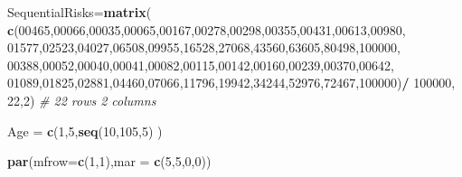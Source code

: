 \documentclass[]{book}
\newenvironment{Shaded}{\begin{snugshade}}{\end{snugshade}}
\newcommand{\CommentTok}[1]{\textcolor[rgb]{0.56,0.35,0.01}{\textit{#1}}}
\newcommand{\DataTypeTok}[1]{\textcolor[rgb]{0.13,0.29,0.53}{#1}}
\newcommand{\DecValTok}[1]{\textcolor[rgb]{0.00,0.00,0.81}{#1}}
\newcommand{\KeywordTok}[1]{\textcolor[rgb]{0.13,0.29,0.53}{\textbf{#1}}}
\newcommand{\NormalTok}[1]{#1}
\newcommand{\OperatorTok}[1]{\textcolor[rgb]{0.81,0.36,0.00}{\textbf{#1}}}
\newcommand{\StringTok}[1]{\textcolor[rgb]{0.31,0.60,0.02}{#1}}
\begin{document}
\begin{Shaded}
\begin{Highlighting}[]
\NormalTok{SequentialRisks=}\KeywordTok{matrix}\NormalTok{(}
\KeywordTok{c}\NormalTok{(}\DecValTok{00465}\NormalTok{,}\DecValTok{00066}\NormalTok{,}\DecValTok{00035}\NormalTok{,}\DecValTok{00065}\NormalTok{,}\DecValTok{00167}\NormalTok{,}\DecValTok{00278}\NormalTok{,}\DecValTok{00298}\NormalTok{,}\DecValTok{00355}\NormalTok{,}\DecValTok{00431}\NormalTok{,}\DecValTok{00613}\NormalTok{,}\DecValTok{00980}\NormalTok{,}
  \DecValTok{01577}\NormalTok{,}\DecValTok{02523}\NormalTok{,}\DecValTok{04027}\NormalTok{,}\DecValTok{06508}\NormalTok{,}\DecValTok{09955}\NormalTok{,}\DecValTok{16528}\NormalTok{,}\DecValTok{27068}\NormalTok{,}\DecValTok{43560}\NormalTok{,}\DecValTok{63605}\NormalTok{,}\DecValTok{80498}\NormalTok{,}\DecValTok{100000}\NormalTok{,}
  \DecValTok{00388}\NormalTok{,}\DecValTok{00052}\NormalTok{,}\DecValTok{00040}\NormalTok{,}\DecValTok{00041}\NormalTok{,}\DecValTok{00082}\NormalTok{,}\DecValTok{00115}\NormalTok{,}\DecValTok{00142}\NormalTok{,}\DecValTok{00160}\NormalTok{,}\DecValTok{00239}\NormalTok{,}\DecValTok{00370}\NormalTok{,}\DecValTok{00642}\NormalTok{,}
  \DecValTok{01089}\NormalTok{,}\DecValTok{01825}\NormalTok{,}\DecValTok{02881}\NormalTok{,}\DecValTok{04460}\NormalTok{,}\DecValTok{07066}\NormalTok{,}\DecValTok{11796}\NormalTok{,}\DecValTok{19942}\NormalTok{,}\DecValTok{34244}\NormalTok{,}\DecValTok{52976}\NormalTok{,}\DecValTok{72467}\NormalTok{,}\DecValTok{100000}\NormalTok{)}\OperatorTok{/}
\StringTok{   }\DecValTok{100000}\NormalTok{,}
\DecValTok{22}\NormalTok{,}\DecValTok{2}\NormalTok{)  }\CommentTok{# 22 rows 2 columns}

\NormalTok{Age =}\StringTok{ }\KeywordTok{c}\NormalTok{(}\DecValTok{1}\NormalTok{,}\DecValTok{5}\NormalTok{,}\KeywordTok{seq}\NormalTok{(}\DecValTok{10}\NormalTok{,}\DecValTok{105}\NormalTok{,}\DecValTok{5}\NormalTok{) )}

\KeywordTok{par}\NormalTok{(}\DataTypeTok{mfrow=}\KeywordTok{c}\NormalTok{(}\DecValTok{1}\NormalTok{,}\DecValTok{1}\NormalTok{),}\DataTypeTok{mar =} \KeywordTok{c}\NormalTok{(}\DecValTok{5}\NormalTok{,}\DecValTok{5}\NormalTok{,}\DecValTok{0}\NormalTok{,}\DecValTok{0}\NormalTok{)) }


\end{Highlighting}
\end{Shaded}
\end{document}
